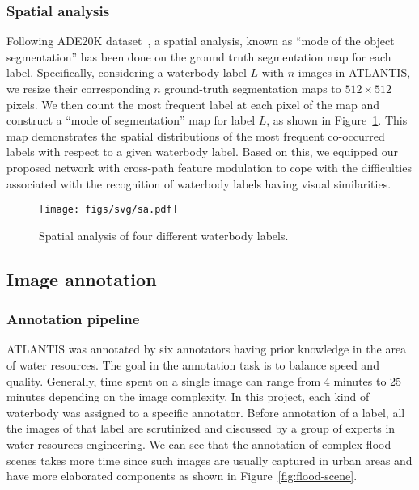 \documentclass{article}
\begin{document}
\subsubsection{Spatial analysis} \label{subsubsec:spatial-analysis}
Following ADE20K dataset~\cite{zhou2019semantic}, a spatial analysis, known as ``mode of the object segmentation'' has been done on the ground truth segmentation map for each label. Specifically, considering a waterbody label $L$ with $n$ images in ATLANTIS, we resize their corresponding $n$ ground-truth segmentation maps to $512 \times 512$ pixels. We then count the most frequent label at each pixel of the map and construct a ``mode of segmentation'' map for label $L$, as shown in Figure~\ref{fig:spatial-analysis}. This map demonstrates the spatial distributions of the most frequent co-occurred labels with respect to a given waterbody label. Based on this, we equipped our proposed network with cross-path feature modulation to cope with the difficulties associated with the recognition of waterbody labels having visual similarities.

\begin{figure}[htbp]
    \centering
    \texttt{[image: figs/svg/sa.pdf]}
    \caption{Spatial analysis of four different waterbody labels.}
    \label{fig:spatial-analysis}
\end{figure}

\subsection{Image annotation} \label{subsubsec:image-annotation}

\subsubsection{Annotation pipeline}
ATLANTIS was annotated by six annotators having prior knowledge in the area of water resources. The goal in the annotation task is to balance speed and quality. Generally, time spent on a single image can range from 4 minutes to 25 minutes depending on the image complexity. In this project, each kind of waterbody was assigned to a specific annotator. Before annotation of a label, all the images of that label are scrutinized and discussed by a group of experts in water resources engineering. 
We can see that the annotation of complex flood scenes takes more time since such images are usually captured in urban areas and have more elaborated components as shown in Figure~\ref{fig:flood-scene}.  
\end{document}
